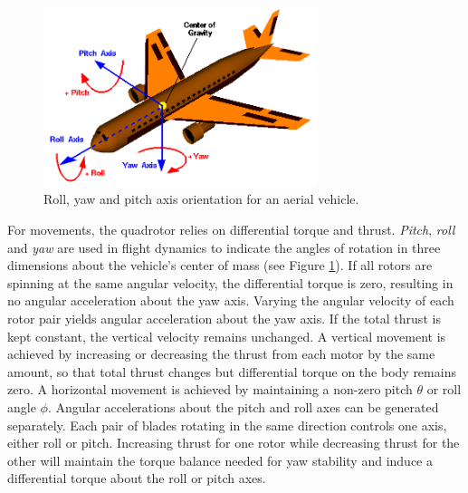 \begin{figure}[htb]
\centering
\includegraphics[width=8cm]{images/Rollpitchyawplain.png}
\caption{Roll, yaw and pitch axis orientation for an aerial vehicle.}
\label{fig:roll-pitch-yaw}
\end{figure}

For movements, the quadrotor relies %
on differential torque and thrust.
\textit{Pitch}, \textit{roll} and \textit{yaw} are used in flight dynamics to indicate the angles of rotation in three dimensions about the vehicle's center of mass (see Figure \ref{fig:roll-pitch-yaw}).
If all rotors are spinning at the same angular velocity, the differential torque is zero, resulting in no angular acceleration about the yaw axis.
Varying the angular velocity of each rotor pair yields angular acceleration about the yaw axis.
If the total thrust is kept constant, the vertical velocity remains unchanged.
A vertical movement is achieved by increasing or decreasing the thrust from each motor by the same amount, so that total thrust changes but differential torque on the body remains zero. 
A horizontal movement is achieved by maintaining a non-zero pitch $\theta$ or roll angle $\phi$.
Angular accelerations about the pitch and roll axes can be generated separately.
Each pair of blades rotating in the same direction controls one axis, either roll or pitch.
Increasing thrust for one rotor while decreasing thrust for the other will maintain the torque balance needed for yaw stability and induce a differential torque about the roll or pitch axes. 

